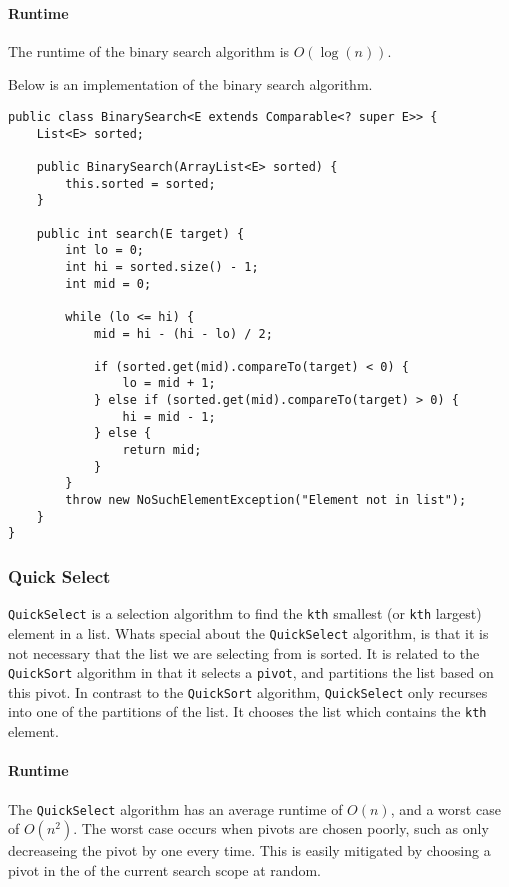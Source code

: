 \documentclass{article}
\begin{document}
    \paragraph{Runtime} The runtime of the binary search algorithm is \( O\left( \log\left( n \right) \right) \).
    \medskip

    Below is an implementation of the binary search algorithm.
    \begin{lstlisting}
public class BinarySearch<E extends Comparable<? super E>> {
    List<E> sorted;

    public BinarySearch(ArrayList<E> sorted) {
        this.sorted = sorted;
    }

    public int search(E target) {
        int lo = 0;
        int hi = sorted.size() - 1;
        int mid = 0;

        while (lo <= hi) {
            mid = hi - (hi - lo) / 2;

            if (sorted.get(mid).compareTo(target) < 0) {
                lo = mid + 1;
            } else if (sorted.get(mid).compareTo(target) > 0) {
                hi = mid - 1;
            } else {
                return mid;
            }
        }
        throw new NoSuchElementException("Element not in list");
    }
}
    \end{lstlisting}
    \subsubsection{Quick Select}
    \texttt{QuickSelect} is a selection algorithm to find the \texttt{kth} smallest (or \texttt{kth} largest) element in a list. Whats special about the \texttt{QuickSelect} algorithm, is that it is not necessary that the list we are selecting from is sorted. It is related to the \texttt{QuickSort} algorithm in that it selects a \texttt{pivot}, and partitions the list based on this pivot. In contrast to the \texttt{QuickSort} algorithm, \texttt{QuickSelect} only recurses into one of the partitions of the list. It chooses the list which contains the \texttt{kth} element.
\medskip

\paragraph{Runtime} The \texttt{QuickSelect} algorithm has an average runtime of \( O(n) \), and a worst case of \( O(n^2) \). The worst case occurs when pivots are chosen poorly, such as only decreaseing the pivot by one every time. This is easily mitigated by choosing a pivot in the of the current search scope at random.
\medskip
\end{document}
